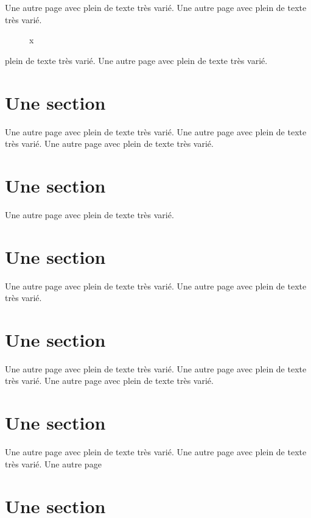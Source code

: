 \documentclass[11pt]{thesul}
\begin{document}
Une autre page avec plein de texte très varié.
Une autre page avec plein de texte très varié.

\begin{figure}[htb]
\caption{x}
\end{figure}

\DontFrameChaptersInToc

\Annexes


plein de texte très varié.
Une autre page avec plein de texte très varié.

\section{Une section}

Une autre page avec plein de texte très varié.
Une autre page avec plein de texte très varié.
Une autre page avec plein de texte très varié.

\section{Une section}

Une autre page avec plein de texte très varié.

\section{Une section}

Une autre page avec plein de texte très varié.
Une autre page avec plein de texte très varié.

\section{Une section}

Une autre page avec plein de texte très varié.
Une autre page avec plein de texte très varié.
Une autre page avec plein de texte très varié.

\section{Une section}

Une autre page avec plein de texte très varié.
Une autre page avec plein de texte très varié.
Une autre page


\section{Une section}
\end{document}
